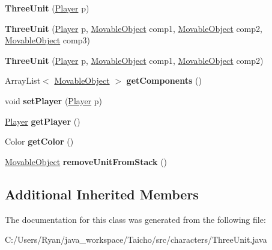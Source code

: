 \begin{DoxyCompactItemize}
\item 
\hypertarget{classcharacters_1_1_three_unit_a0a59db758d4bdf864436911a7d3ef54b}{{\bfseries Three\-Unit} (\hyperlink{enumenums_1_1_player}{Player} p)}\label{classcharacters_1_1_three_unit_a0a59db758d4bdf864436911a7d3ef54b}

\item 
\hypertarget{classcharacters_1_1_three_unit_abe178138148db8a6cf7277d4ea5ef44f}{{\bfseries Three\-Unit} (\hyperlink{enumenums_1_1_player}{Player} p, \hyperlink{classbasecomponents_1_1_movable_object}{Movable\-Object} comp1, \hyperlink{classbasecomponents_1_1_movable_object}{Movable\-Object} comp2, \hyperlink{classbasecomponents_1_1_movable_object}{Movable\-Object} comp3)}\label{classcharacters_1_1_three_unit_abe178138148db8a6cf7277d4ea5ef44f}

\item 
\hypertarget{classcharacters_1_1_three_unit_adf387aeb5a33ebb2cd69410f32d9eefa}{{\bfseries Three\-Unit} (\hyperlink{enumenums_1_1_player}{Player} p, \hyperlink{classbasecomponents_1_1_movable_object}{Movable\-Object} comp1, \hyperlink{classbasecomponents_1_1_movable_object}{Movable\-Object} comp2)}\label{classcharacters_1_1_three_unit_adf387aeb5a33ebb2cd69410f32d9eefa}

\item 
\hypertarget{classcharacters_1_1_three_unit_abcb37f1c97d8e8e0680163784dc9173f}{Array\-List$<$ \hyperlink{classbasecomponents_1_1_movable_object}{Movable\-Object} $>$ {\bfseries get\-Components} ()}\label{classcharacters_1_1_three_unit_abcb37f1c97d8e8e0680163784dc9173f}

\item 
\hypertarget{classcharacters_1_1_three_unit_a3e17207381edb02d29716bd8b4cc6bb4}{void {\bfseries set\-Player} (\hyperlink{enumenums_1_1_player}{Player} p)}\label{classcharacters_1_1_three_unit_a3e17207381edb02d29716bd8b4cc6bb4}

\item 
\hypertarget{classcharacters_1_1_three_unit_a220b7b388a107285e728060bc0fb5f20}{\hyperlink{enumenums_1_1_player}{Player} {\bfseries get\-Player} ()}\label{classcharacters_1_1_three_unit_a220b7b388a107285e728060bc0fb5f20}

\item 
\hypertarget{classcharacters_1_1_three_unit_a8e8c39b20320c930a4c9d451ea9a1c78}{Color {\bfseries get\-Color} ()}\label{classcharacters_1_1_three_unit_a8e8c39b20320c930a4c9d451ea9a1c78}

\item 
\hypertarget{classcharacters_1_1_three_unit_ab8a6dfbbcf8a40fdb4932006dc3f3dc3}{\hyperlink{classbasecomponents_1_1_movable_object}{Movable\-Object} {\bfseries remove\-Unit\-From\-Stack} ()}\label{classcharacters_1_1_three_unit_ab8a6dfbbcf8a40fdb4932006dc3f3dc3}

\end{DoxyCompactItemize}
\subsection*{Additional Inherited Members}


The documentation for this class was generated from the following file\-:\begin{DoxyCompactItemize}
\item 
C\-:/\-Users/\-Ryan/java\-\_\-workspace/\-Taicho/src/characters/Three\-Unit.\-java\end{DoxyCompactItemize}
